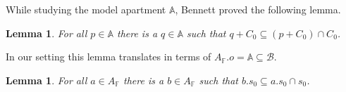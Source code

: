 \documentclass[12pt]{amsart}
\newcommand{\F}{\mathbb{F} }
\newcommand{\R}{\mathbb{R} }
\newcommand{\N}{\mathbb{N} }
\newcommand{\Ap}{A^+}
\newcommand{\A}{\mathbb{A}}
\newcommand{\B}{\mathcal{B}}
\numberwithin{equation}{section}
\newtheorem{lemma}[theorem]{Lemma}
\theoremstyle{remark} %
\begin{document}
		
		While studying the model apartment $\A$, Bennett \cite[Prop 2.9]{Ben1} proved the following lemma.
		
		\begin{lemma}
			For all $p \in \A$ there is a $q\in \A$ such that $q+C_0 \subseteq (p+C_0) \cap C_0$.
		\end{lemma}
		In our setting this lemma translates in terms of $A_\F.o = \A\subseteq \B$.
		\begin{lemma} \label{lem:A4:a_sub}
			For all $a\in A_\F$ there is a $b\in A_\F$ such that $b.s_0 \subseteq a.s_0 \cap s_0$.
		\end{lemma}
		
\end{document}
